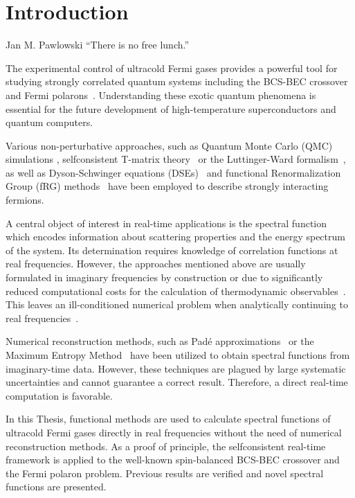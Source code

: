 \chapter{Introduction}
\label{chapter:introduction}

\begin{chapquote}[2em]{Jan M. Pawlowski}
``There is no free lunch.''
\end{chapquote}

The experimental control of ultracold Fermi gases provides a powerful tool for studying strongly correlated quantum systems including the BCS-BEC crossover~\cite{Randeria2014} and Fermi polarons~\cite{Parish2023}. Understanding these exotic quantum phenomena is essential for the future development of high-temperature superconductors and quantum computers.

Various non-perturbative approaches, such as Quantum Monte Carlo (QMC) simulations \cite{Magierski2009,Prokofev2008}, selfconsistent T-matrix theory~\cite{Hanai2013,Pini2019} or the Luttinger-Ward formalism~\cite{Haussmann1999,Haussmann2007}, as well as Dyson-Schwinger equations (DSEs)~\cite{Boettcher2013,Diener2008} and functional Renormalization Group (fRG) methods~\cite{Diehl2006-2,Diehl2010} have been employed to describe strongly interacting fermions.

A central object of interest in real-time applications is the spectral function~\cite{Kallen1952,Lehmann1954} which encodes information about scattering properties and the energy spectrum of the system. Its determination requires knowledge of correlation functions at real frequencies. However, the approaches mentioned above are usually formulated in imaginary frequencies by construction or due to significantly reduced computational costs for the calculation of thermodynamic observables~\cite{Frank2018}. This leaves an ill-conditioned numerical problem when analytically continuing to real frequencies~\cite{Wink2020}.

Numerical reconstruction methods, such as Padé approximations~\cite{Schmidt2011} or the Maximum Entropy Method~\cite{Haussmann2009} have been utilized to obtain spectral functions from imaginary-time data. However, these techniques are plagued by large systematic uncertainties and cannot guarantee a correct result. Therefore, a direct real-time computation is favorable.

In this Thesis, functional methods are used to calculate spectral functions of ultracold Fermi gases directly in real frequencies without the need of numerical reconstruction methods. As a proof of principle, the selfconsistent real-time framework is applied to the well-known spin-balanced BCS-BEC crossover and the Fermi polaron problem. Previous results are verified and novel spectral functions are presented.

